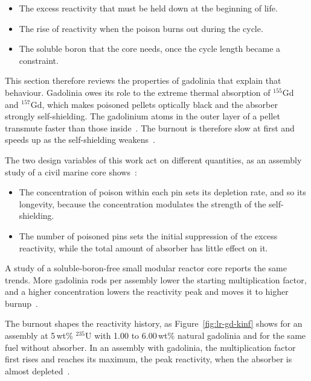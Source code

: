 \begin{itemize}
  \item The excess reactivity that must be held down at the beginning of
        life.

  \item The rise of reactivity when the poison burns out during the
        cycle.

  \item The soluble boron that the core needs, once the cycle length
        became a constraint.
\end{itemize}

This section therefore reviews the properties of gadolinia that explain
that behaviour. Gadolinia owes its role to the extreme thermal absorption of $^{155}$Gd
and $^{157}$Gd, which makes poisoned pellets optically black and the
absorber strongly self-shielding. The gadolinium atoms in the outer layer
of a pellet transmute faster than those inside~\cite{gd_enriched_2021}.
The burnout is therefore slow at first and speeds up as the
self-shielding weakens~\cite{duderstadt_hamilton_1976}.

The two design variables of this work act on different quantities, as an
assembly study of a civil marine core shows~\cite{alam_partI_2019}:

\begin{itemize}
  \item The concentration of poison within each pin sets its depletion
        rate, and so its longevity, because the concentration modulates
        the strength of the self-shielding.

  \item The number of poisoned pins sets the initial suppression of the
        excess reactivity, while the total amount of absorber has little
        effect on it.
\end{itemize}

A study of a soluble-boron-free small modular reactor core reports the
same trends. More gadolinia rods per assembly lower the starting
multiplication factor, and a higher concentration lowers the reactivity
peak and moves it to higher burnup~\cite{song_sanchez_2026}.

The burnout shapes the reactivity history, as
Figure~\ref{fig:lr-gd-kinf} shows for an assembly at 5\,wt\%
$^{235}$U with 1.00 to 6.00\,wt\% natural gadolinia and for the same
fuel without absorber. In an assembly with gadolinia,
the multiplication factor first rises and reaches its maximum, the peak
reactivity, when the absorber is almost depleted~\cite{gd_enriched_2021}.

